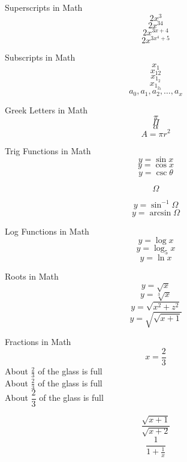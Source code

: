 \documentclass[11pt]{article}
\begin{document}
Superscripts in Math
$$2x^3$$
$$2x^{34}$$
$$2x^{3x+4}$$
$$2x^{3x^4+5}$$

Subscripts in Math
$$x_1$$
$$x_{12}$$
$$x_{1_2}$$
$$x_{1_{2_3}}$$
$$a_0,a_1,a_2, \ldots, a_x$$

Greek Letters in Math
$$\pi$$
$$\Pi$$
$$\alpha$$
$$A=\pi r^2$$

Trig Functions in Math
$$y=\sin x$$
$$y=\cos x$$
$$y=\csc \theta$$

$$\Omega$$

$$y=\sin^{-1} \Omega$$
$$y=\arcsin \Omega$$

Log Functions in Math
$$y=\log x$$
$$y=\log_5 x$$
$$y=\ln x$$

Roots in Math
$$y=\sqrt{x}$$
$$y=\sqrt[3]{x}$$
$$y=\sqrt{x^2+z^2}$$
$$y=\sqrt{\sqrt{x+1}}$$

Fractions in Math
$$x=\frac{2}{3}$$
About $\frac{2}{3}$ of the glass is full \\[16pt]
About $\displaystyle \frac{2}{3}$ of the glass is full \\[16pt] About $\dfrac{2}{3}$ of the glass is full

$$\frac{\sqrt{x+1}}{\sqrt{x+2}}$$
$$\frac{1}{1+\frac{1}{x}}$$
\end{document}
